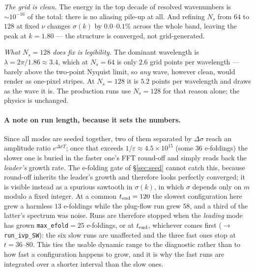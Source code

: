 \documentclass[11pt]{article}
\newcommand{\code}[1]{\texttt{\small #1}}
\begin{document}
\emph{The grid is clean.} The energy in the top decade of resolved wavenumbers is
$\sim10^{-16}$ of the total: there is no aliasing pile-up at all. And refining $N_s$
from $64$ to $128$ at fixed $\nu$ changes $\sigma(k)$ by $0.0$--$0.1\%$ across the whole
band, leaving the peak at $k=1.80$ --- the structure is converged, not grid-generated.

\emph{What $N_s=128$ does fix is legibility.} The dominant wavelength is
$\lambda=2\pi/1.86\approx3.4$, which at $N_s=64$ is only $2.6$ grid points per
wavelength --- barely above the two-point Nyquist limit, so \emph{any} wave, however
clean, would render as one-pixel stripes. At $N_s=128$ it is $5.2$ points per
wavelength and draws as the wave it is. The production runs use $N_s=128$ for that
reason alone; the physics is unchanged.

\paragraph{A note on run length, because it sets the numbers.} Since all modes are
seeded together, two of them separated by $\Delta\sigma$ reach an amplitude ratio
$e^{\Delta\sigma T}$; once that exceeds $1/\varepsilon\approx4.5\times10^{15}$ (some
$36$ e-foldings) the slower one is buried in the faster one's FFT round-off and simply
reads back the \emph{leader's} growth rate. The e-folding gate of \S\ref{sec:seed}
cannot catch this, because round-off inherits the leader's growth and therefore looks
perfectly converged; it is visible instead as a spurious sawtooth in $\sigma(k)$, in
which $\sigma$ depends only on $m$ modulo a fixed integer. At a common $t_{\rm end}=120$
the slowest configuration here grew a harmless $13$ e-foldings while the plug-flow run
grew $58$, and a third of the latter's spectrum was noise. Runs are therefore stopped
when the \emph{leading} mode has grown \code{max\_efold}$=25$ e-foldings, or at
$t_{\rm end}$, whichever comes first ($\to$ \code{run\_ivp\_SW}): the six slow runs are
unaffected and the three fast ones stop at $t=36$--$80$. This ties the usable dynamic
range to the diagnostic rather than to how fast a configuration happens to grow, and it
is why the fast runs are integrated over a shorter interval than the slow ones.
\end{document}
